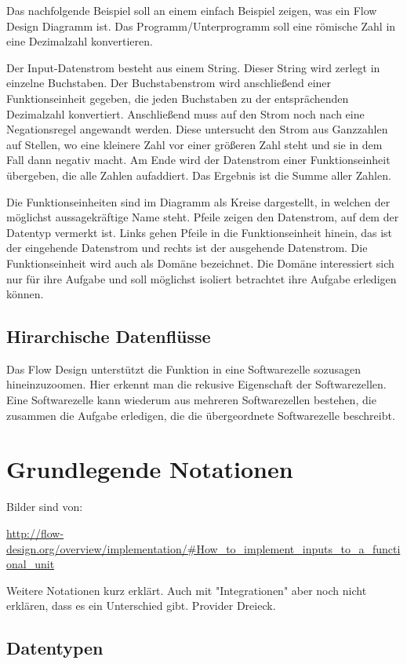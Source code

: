 \documentclass[11pt]{article}
\begin{document}
Das nachfolgende Beispiel soll an einem einfach Beispiel zeigen, was ein Flow Design Diagramm ist.
Das Programm/Unterprogramm soll eine römische Zahl in eine Dezimalzahl konvertieren.

Der Input-Datenstrom besteht aus einem String. Dieser String wird zerlegt in einzelne Buchstaben.
Der Buchstabenstrom wird anschließend einer Funktionseinheit gegeben, die jeden Buchstaben zu der entsprächenden 
Dezimalzahl konvertiert. Anschließend muss auf den Strom noch nach eine Negationsregel angewandt werden. Diese untersucht den
Strom aus Ganzzahlen auf Stellen, wo eine kleinere Zahl vor einer größeren Zahl steht und sie in dem Fall dann negativ macht.
Am Ende wird der Datenstrom einer Funktionseinheit übergeben, die alle Zahlen aufaddiert.
Das Ergebnis ist die Summe aller Zahlen. 

Die Funktionseinheiten sind im Diagramm als Kreise dargestellt, in welchen der möglichst aussagekräftige Name steht.
Pfeile zeigen den Datenstrom, auf dem der Datentyp vermerkt ist.
Links gehen Pfeile in die Funktionseinheit hinein, das ist der eingehende Datenstrom und rechts ist der ausgehende Datenstrom.
Die Funktionseinheit wird auch als Domäne bezeichnet. Die Domäne interessiert sich nur für ihre Aufgabe und soll möglichst isoliert
betrachtet ihre Aufgabe erledigen können.
\subsection{Hirarchische Datenflüsse}
\label{sec:orgheadline3}
Das Flow Design unterstützt die Funktion in eine Softwarezelle sozusagen hineinzuzoomen.
Hier erkennt man die rekusive Eigenschaft der Softwarezellen. Eine Softwarezelle kann wiederum aus mehreren Softwarezellen bestehen,
die zusammen die Aufgabe erledigen, die die übergeordnete Softwarezelle beschreibt.


\section{Grundlegende Notationen}
\label{sec:orgheadline18}
Bilder sind von: 

\url{http://flow-design.org/overview/implementation/#How_to_implement_inputs_to_a_functional_unit}

Weitere Notationen kurz erklärt. Auch mit "Integrationen" aber noch nicht erklären, dass es ein Unterschied gibt.
Provider Dreieck.
\subsection{Datentypen}
\label{sec:orgheadline5}
\end{document}
